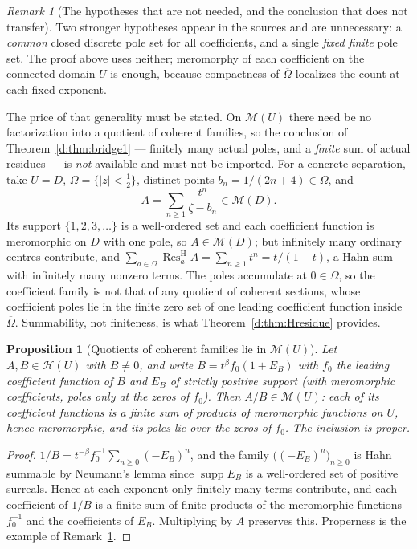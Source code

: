 \documentclass[11pt,a4paper]{article}
\numberwithin{equation}{section}
\newtheorem{proposition}[theorem]{Proposition}
\theoremstyle{definition}
\theoremstyle{remark}
\newtheorem{remark}[theorem]{Remark}
\theoremstyle{plain}
\DeclareMathOperator{\supp}{supp}
\newcommand{\tm}{t}
\newcommand{\Hc}{\mathcal H}
\newcommand{\Mc}{\mathcal M}
\DeclareMathOperator{\Res}{Res}                 %
\newcommand{\ResH}[1]{\Res^{\mathrm H}_{#1}}    %
\newcommand{\abs}[1]{\lvert #1\rvert}
\begin{document}
\begin{remark}[The hypotheses that are not needed, and the conclusion that does not transfer]
\label{d:rem:Hresiduescope}
Two stronger hypotheses appear in the sources and are unnecessary: a
\emph{common} closed discrete pole set for all coefficients, and a
single \emph{fixed finite} pole set.  The proof above uses neither;
meromorphy of each coefficient on the connected domain $U$ is enough,
because compactness of $\overline\Omega$ localizes the count at each
fixed exponent.

The price of that generality must be stated.  On $\Mc(U)$ there need be
no factorization into a quotient of coherent families, so the
conclusion of Theorem~\ref{d:thm:bridge1} --- finitely many actual
poles, and a \emph{finite} sum of actual residues --- is \emph{not}
available and must not be imported.  For a concrete separation, take
$U=D$, $\Omega=\{\abs z<\tfrac12\}$, distinct points
$b_n=1/(2n+4)\in\Omega$, and
\[
 A=\sum_{n\ge1}\frac{\tm^{n}}{\zeta-b_n}\in\Mc(D).
\]
Its support $\{1,2,3,\dots\}$ is a well-ordered set and each coefficient
function is meromorphic on $D$ with one pole, so $A\in\Mc(D)$; but
infinitely many ordinary centres contribute, and
$\sum_{a\in\Omega}\ResH{a}A=\sum_{n\ge1}\tm^{n}=\tm/(1-\tm)$, a Hahn sum
with infinitely many nonzero terms.  The poles accumulate at
$0\in\Omega$, so the coefficient family is not that of any quotient of
coherent sections, whose coefficient poles lie in the finite zero set of
one leading coefficient function inside $\overline\Omega$.  Summability,
not finiteness, is what Theorem~\ref{d:thm:Hresidue} provides.
\end{remark}

\begin{proposition}[Quotients of coherent families lie in $\Mc(U)$]
\label{d:prop:quotientinM}
Let $A,B\in\Hc(U)$ with $B\ne0$, and write
$B=\tm^{\beta}f_0(1+E_B)$ with $f_0$ the leading coefficient function of
$B$ and $E_B$ of strictly positive support (with meromorphic
coefficients, poles only at the zeros of $f_0$).  Then
$A/B\in\Mc(U)$: each of its coefficient functions is a finite sum of
products of meromorphic functions on $U$, hence meromorphic, and its
poles lie over the zeros of $f_0$.  The inclusion is proper.
\end{proposition}

\begin{proof}
$1/B=\tm^{-\beta}f_0^{-1}\sum_{n\ge0}(-E_B)^{n}$, and the family
$\bigl((-E_B)^{n}\bigr)_{n\ge0}$ is Hahn summable by Neumann's lemma
since $\supp E_B$ is a well-ordered set of positive surreals.  Hence at
each exponent only finitely many terms contribute, and each coefficient
of $1/B$ is a finite sum of finite products of the meromorphic
functions $f_0^{-1}$ and the coefficients of $E_B$.  Multiplying by $A$
preserves this.  Properness is the example of
Remark~\ref{d:rem:Hresiduescope}.
\end{proof}
\end{document}
